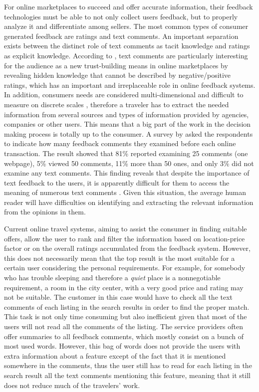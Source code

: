 For online marketplaces to succeed and offer accurate information, their feedback technologies must be able to not only collect users feedback, but to properly analyze it and differentiate among sellers. The most common types of consumer generated feedback are ratings and text comments.  An important separation exists between the distinct role of text comments as tacit knowledge and ratings as explicit knowledge. According to \cite{pavlou2006nature}, text comments are particularly interesting for the audience as a new trust-building means in online marketplaces by revealing hidden knowledge that cannot be described by negative/positive ratings, which has an important and irreplaceable role in online feedback systems. In addition, consumers needs are considered multi-dimensional and difficult to measure on discrete scales \cite{luo2005information}, therefore a traveler has to extract the needed information from several sources and types of information provided by agencies, companies or other users. This means that a big part of the work in the decision making process is totally up to the consumer. A survey by \cite{pavlou2006institutional} asked the respondents to indicate how many feedback comments they examined before each online transaction. The result showed that 81\% reported examining 25 comments (one webpage), 5\% viewed 50 comments, 11\% more than 50 ones, and only 3\% did not examine any text comments. This finding reveals that despite the importance of text feedback to the users, it is apparently difficult for them to access the meaning of numerous text comments \cite{pavlou2006institutional}.  Given this situation, the average human reader will have difficulties on identifying and extracting the relevant information from the opinions in them.  

Current online travel systems, aiming to assist the consumer in finding suitable offers, allow the user to rank and filter the information based on location-price factor or on the overall ratings accumulated from the feedback system. However, this does not necessarily mean that the top result is the most suitable for a certain user considering the personal requirements. For example, for somebody who has trouble sleeping and therefore  a \textit{quiet} place is a nonnegotiable requirement, a room in the city center, with a very good price and rating may not be suitable. The customer in this case would have to check all the text comments of each listing in the search results in order to find the proper match. This task is not only time consuming but also inefficient given that most of the users will not read all the comments of the listing. The service providers often offer summaries to all feedback comments, which mostly consist on a bunch of most used words. However, this bag of words does not provide the users with extra information about a feature except of the fact that it is mentioned somewhere in the comments, thus the user still has to read for each listing in the search result all the text comments mentioning this feature, meaning that it still does not reduce much of the travelers' work. 

